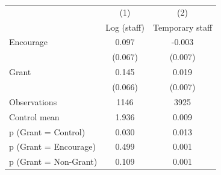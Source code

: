 \begin{tabular*}{\hsize}{@{\hskip\tabcolsep\extracolsep\fill}l*{2}{c}}
\toprule
                    &\multicolumn{1}{c}{(1)}&\multicolumn{1}{c}{(2)}\\
                    &\multicolumn{1}{c}{Log (staff)}&\multicolumn{1}{c}{Temporary staff}\\
\midrule
Encourage           &       0.097&      -0.003\\
                    &     (0.067)&     (0.007)\\
\addlinespace
Grant               &       0.145&       0.019\\
                    &     (0.066)&     (0.007)\\
\midrule
Observations        &        1146&        3925\\
Control mean        &       1.936&       0.009\\
p (Grant = Control) &       0.030&       0.013\\
p (Grant = Encourage)&       0.499&       0.001\\
p (Grant = Non-Grant)&       0.109&       0.001\\
\bottomrule
\end{tabular*}
